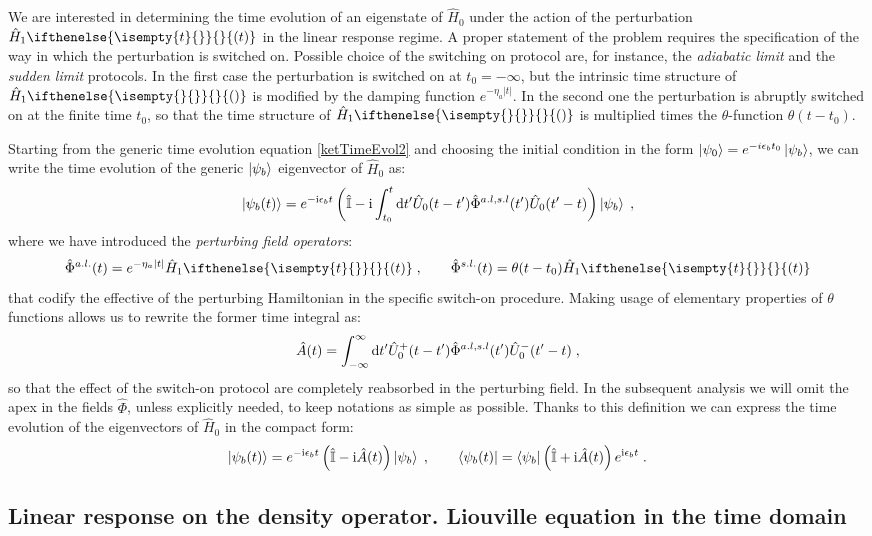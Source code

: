 \documentclass[a4paper]{article}
\newcommand{\dd}{{\rm d}}
\newcommand{\eps}{\epsilon}
\newcommand{\ii}{\mathrm{i}}
\newcommand{\intdef}[3]{\int_{#1}^{#2} \dd {#3}}
\newcommand{\be}{\begin{equation}}
\newcommand{\ee}{\end{equation}}
\newcommand{\qq}{\qquad}
\newcommand{\lb}{\label}
\newcommand{\op}[1]{\hat {#1}}
\newcommand{\argument}[1]{\ifthenelse{\isempty{#1}{}}{}{(#1)}}
\newcommand{\hnot}{\op{H}_0}
\newcommand{\hone}[1]{\op{H}_1\argument{#1}}
\newcommand{\identity}{\op{\mathbb I}}
\begin{document}
We are interested in determining the time evolution of an eigenstate of $\hnot$ under the action of the perturbation $\hone{t}$ in the linear 
response regime. A proper statement of the problem requires the specification of the way in which the perturbation is switched on.
Possible choice of the switching on protocol are, for instance, the \emph{adiabatic limit} and the \emph{sudden limit} protocols. In the first
case the perturbation is switched on at $t_0=-\infty$, but the intrinsic time structure of $\hone{}$ is modified by the damping function 
$e^{-\eta_a |t|}$. In the second one the perturbation is abruptly switched on at the finite time $t_0$, so that the time structure of
$\hone{}$ is multiplied times the $\theta$-function $\theta(t-t_0)$.

Starting from the generic time evolution equation \eqref{ketTimeEvol2} and choosing the initial condition in the form 
$\ket{\psi_0} = e^{-\\i \eps_b t_0}\ket{\psi_b}$, we can write the time evolution of the generic $\ket{\psi_b}$ eigenvector of $\hnot$ as:
\be \lb{ketTimeEvol3} 
\ket{\psi_b(t)} = e^{-\ii \eps_b t}\left( \identity - \ii \intdef{t_0}{t}{t'} \op{U}_0(t-t') \op\Phi^{a.l,s.l}(t') \op{U}_0(t'-t)  \right)\ket{\psi_b} \; ,
\ee
where we have introduced the \emph{perturbing field operators}: 
\be
\op\Phi^{a.l.}(t) = e^{-\eta_a |t|} \hone{t} \;, \qq
\op\Phi^{s.l.}(t) = \theta(t-t_0) \hone{t}
\ee
that codify the effective of the perturbing Hamiltonian in the specific switch-on procedure. Making usage of elementary properties of $\theta$ functions allows us
to rewrite the former time integral as:
\be\lb{AopDef1}
\op A(t) = \intdef{-\infty}{\infty}{t'} \op{U}^{+}_0(t-t') \op\Phi^{a.l,s.l}(t') \op{U}^{-}_0(t'-t) \;,
\ee
so that the effect of the switch-on protocol are completely reabsorbed in the perturbing field. In the subsequent analysis we will omit the apex in the fields $\op\Phi$, 
unless explicitly needed, to keep notations as simple as possible. Thanks to this definition we can express the time evolution of the eigenvectors of $\hnot$ in the 
compact form:
\be\lb{ketBraTimeEvol1}
\ket{\psi_b(t)} = e^{-\ii \eps_b t}\left( \identity - \ii \op A(t)  \right)\ket{\psi_b} \; , \qq 
\bra{\psi_b(t)} = \bra{\psi_b} \left( \identity + \ii \op A(t)  \right) e^{\ii \eps_b t} \; .
\ee

\subsection{Linear response on the density operator. Liouville equation in the time domain}
\end{document}
